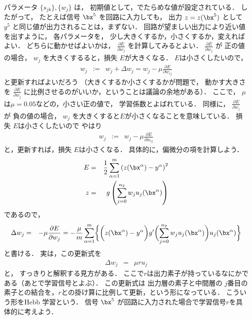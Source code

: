 \documentclass[a4paper,11pt]{jarticle}
\begin{document}
パラメータ
$\{s_{jk} \}, \{w_j\}$ は，
初期値として，でたらめな値が設定されている．
したがって，
たとえば信号 $\bx^5$ を回路に入力しても，
出力 $z=z(\bx^5)$ として $y^5$ と同じ値が出力されることは，まずない．
回路が望ましい出力により近い値を出すように，
各パラメータを，
少し大きくするか，小さくするか，変えればよい．
どちらに動かせばよいかは，
$ \frac{\partial E}{\partial w_{j}} $ を計算してみるとよい．
$ \frac{\partial E}{\partial w_{j}} $ が
正の値の場合，
$w_j$ を大きくするると，損失 $E$が大きくなる．
$E$は小さくしたいので，
\begin{eqnarray}
w_j & := & w_j  + \Delta w_{j} =  w_j - \mu \frac{\partial E}{\partial w_{ij}} 
\end{eqnarray}
と更新すればよいだろう
（大きくするか小さくするかが問題で，
動かす大きさを $ \frac{\partial E}{\partial w_{j}} $
に比例させるのがいいか，ということは議論の余地がある）．
ここで，
$\mu$は$\mu = 0.05$などの，小さい正の値で，
学習係数とよばれている．
同様に，
$ \frac{\partial E}{\partial w_{j}} $ が
負の値の場合，
$w_j$ を大きくすると$E$が小さくなることを意味している．
損失 $E$は小さくしたいので
やはり
\begin{eqnarray}
w_j & := &  w_j - \mu \frac{\partial E}{\partial w_{ij}} 
\end{eqnarray}
と，更新すれば，損失 $E$は小さくなる．
具体的に，偏微分の項を計算しよう．
%
\begin{eqnarray}
E & = & \frac{1}{2} 
\sum_{\alpha=1}^{m} 
\left ( z(\bx^\alpha) - y^\alpha \right )^2\\
 z & = & g \left ( \sum_{j=0}^{n_2} w_j u_j(\bx^\alpha)\right ) 
 \end{eqnarray}
 であるので，
\begin{eqnarray}
\Delta w_{j} & = & - \mu \frac{\partial E}{\partial w_{j}} 
 = 
-\frac{\mu}{m}
\sum_{\alpha=1}^{m}
\biggl \{
\biggl ( z(\bx^\alpha) - y^\alpha
\biggr )
g' \biggl ( \sum_{j=0}^{n_2} w_j u_j(\bx^\alpha)  \biggr )   u_j(\bx^\alpha) 
\biggr \}
\end{eqnarray}
と書ける．
実は，この更新式を
\begin{eqnarray}
\Delta w_{j}  & = & \mu   r u_j 
\end{eqnarray}
と，
すっきりと解釈する見方がある．
ここで$r$は出力素子が持っているなにかである（あとで学習信号とよぶ）．
この更新式は
出力層の素子と中間層の
$j$番目の素子との結合を，$r$との掛け算に比例して更新，という形になっている．
こういう形をHebb 学習という．
信号 $\bx^5$ が回路に入力された場合で学習信号$r$を具体的に考えよう．
\end{document}

